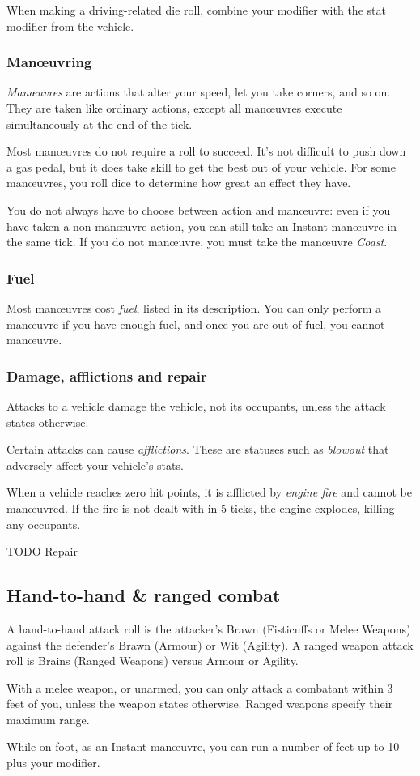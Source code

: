 \documentclass[10pt, a4paper, twocolumn]{article}
\begin{document}
When making a driving-related die roll, combine your 
modifier with the stat modifier from the vehicle.

\subsubsection{Man\oe{}uvring}
\emph{Man\oe{}uvres} are actions that alter your speed, let you take corners,
and so on. They are taken like ordinary actions, except all man\oe{}uvres
execute simultaneously at the end of the tick. 

Most man\oe{}uvres do not require a roll to succeed. It's not difficult to push
down a gas pedal, but it does take skill to get the best out of your vehicle.
For some man\oe{}uvres, you roll dice to determine how great an effect they
have.

You do not always have to choose between action and man\oe{}uvre: even if you
have taken a non-man\oe{}uvre action, you can still take an Instant man\oe{}uvre
in the same tick. If you do not man\oe{}uvre, you must take the man\oe{}uvre
\emph{Coast}.

\subsubsection{Fuel}
Most man\oe{}uvres cost \emph{fuel}, listed in its description. You can only
perform a man\oe{}uvre if you have enough fuel, and once you are out of fuel,
you cannot man\oe{}uvre.

\subsubsection{Damage, afflictions and repair}
Attacks to a vehicle damage the vehicle, not its occupants, unless the attack
states otherwise.

Certain attacks can cause \emph{afflictions}. These are statuses such as
\emph{blowout} that adversely affect your vehicle's stats.

When a vehicle reaches zero hit points, it is afflicted by \emph{engine fire}
and cannot be man\oe{}uvred. If the fire is not dealt with in 5 ticks, the
engine explodes, killing any occupants.

TODO Repair

\subsection{Hand-to-hand \& ranged combat}
A hand-to-hand attack roll is the attacker's Brawn (Fisticuffs or Melee Weapons)
against the defender's Brawn (Armour) or Wit (Agility). A ranged weapon attack
roll is Brains (Ranged Weapons) versus Armour or Agility. 

With a melee weapon, or unarmed, you can only attack a combatant within 3 feet
of you, unless the weapon states otherwise. Ranged weapons specify their maximum
range. 

While on foot, as an Instant man\oe{}uvre, you can run a number of feet up to 10
plus your  modifier.
\end{document}
